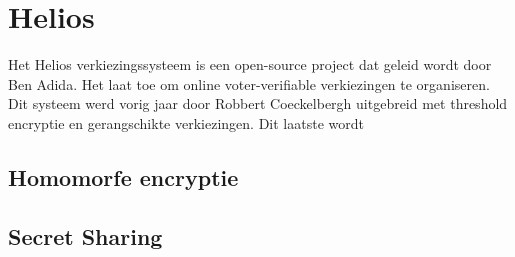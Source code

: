 % 
%

\chapter{Helios}
\label{chap:helios}

Het Helios verkiezingssysteem is een open-source project dat geleid wordt door Ben Adida. Het laat toe om online voter-verifiable verkiezingen te organiseren. Dit systeem werd vorig jaar door Robbert Coeckelbergh uitgebreid met threshold encryptie en gerangschikte verkiezingen.\cite{coeckelbergh_toepassing_en_uitbreiding_van_het_helios_online_verkiezingssysteem} Dit laatste wordt 

\section{Homomorfe encryptie}

\section{Secret Sharing}
